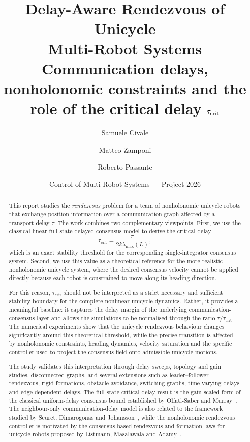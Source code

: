 \documentclass[11pt,a4paper]{article}
\title{\vspace{-1.2cm}\textbf{\color{accent}Delay-Aware Rendezvous of Unicycle\\ Multi-Robot Systems}\\[0.3cm]
\large Communication delays, nonholonomic constraints and the role of the critical delay $\taucrit$}
\author{Samuele Civale \and Matteo Zamponi \and Roberto Passante}
\date{Control of Multi-Robot Systems --- Project 2026}
\newcommand{\taucrit}{\tau_{\mathrm{crit}}}
\begin{document}
\maketitle
\thispagestyle{fancy}

\begin{abstract}
\noindent
This report studies the \emph{rendezvous} problem for a team of nonholonomic unicycle robots
that exchange position information over a communication graph affected by a transport delay
$\tau$. The work combines two complementary viewpoints. First, we use the classical linear
full-state delayed-consensus model to derive the critical delay
\[
\taucrit = \frac{\pi}{2k\lambda_{\max}(L)},
\]
which is an exact stability threshold for the corresponding single-integrator consensus
system. Second, we use this value as a theoretical reference for the more realistic
nonholonomic unicycle system, where the desired consensus velocity cannot be applied directly
because each robot is constrained to move along its heading direction.

For this reason, $\taucrit$ should not be interpreted as a strict necessary and sufficient
stability boundary for the complete nonlinear unicycle dynamics. Rather, it provides a
meaningful baseline: it captures the delay margin of the underlying communication-consensus
layer and allows the simulations to be normalised through the ratio $\tau/\taucrit$. The
numerical experiments show that the unicycle rendezvous behaviour changes significantly
around this theoretical threshold, while the precise transition is affected by nonholonomic
constraints, heading dynamics, velocity saturation and the specific controller used to project
the consensus field onto admissible unicycle motions.

The study validates this interpretation through delay sweeps, topology and gain studies,
disconnected graphs, and several extensions such as leader--follower rendezvous, rigid
formations, obstacle avoidance, switching graphs, time-varying delays and edge-dependent
delays. The full-state critical-delay result is the gain-scaled form of the classical uniform-delay
consensus bound established by Olfati-Saber and Murray~\cite{olfati2004consensus}. The
neighbour-only communication-delay model is also related to the framework studied by Seuret,
Dimarogonas and Johansson~\cite{seuret2008consensus}, while the nonholonomic rendezvous
controller is motivated by the consensus-based rendezvous and formation laws for unicycle
robots proposed by Listmann, Masalawala and Adamy~\cite{listmann2009formation}.
\end{abstract}
\end{document}
